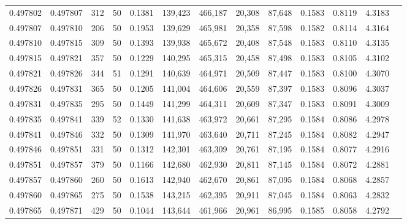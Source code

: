 \begin{tabular}{rrrrrrrrrrrrr}
0.497802 & 0.497807 & 312 &  50 &                                     0.1381 & 139,423 & 466,187 &  20,308 &  87,648 & 0.1583 & 0.8119 & 4.3183 \\
0.497807 & 0.497810 & 206 &  50 &                                     0.1953 & 139,629 & 465,981 &  20,358 &  87,598 & 0.1582 & 0.8114 & 4.3164 \\
0.497810 & 0.497815 & 309 &  50 &                                     0.1393 & 139,938 & 465,672 &  20,408 &  87,548 & 0.1583 & 0.8110 & 4.3135 \\
0.497815 & 0.497821 & 357 &  50 &                                     0.1229 & 140,295 & 465,315 &  20,458 &  87,498 & 0.1583 & 0.8105 & 4.3102 \\
0.497821 & 0.497826 & 344 &  51 &                                     0.1291 & 140,639 & 464,971 &  20,509 &  87,447 & 0.1583 & 0.8100 & 4.3070 \\
0.497826 & 0.497831 & 365 &  50 &                                     0.1205 & 141,004 & 464,606 &  20,559 &  87,397 & 0.1583 & 0.8096 & 4.3037 \\
0.497831 & 0.497835 & 295 &  50 &                                     0.1449 & 141,299 & 464,311 &  20,609 &  87,347 & 0.1583 & 0.8091 & 4.3009 \\
0.497835 & 0.497841 & 339 &  52 &                                     0.1330 & 141,638 & 463,972 &  20,661 &  87,295 & 0.1584 & 0.8086 & 4.2978 \\
0.497841 & 0.497846 & 332 &  50 &                                     0.1309 & 141,970 & 463,640 &  20,711 &  87,245 & 0.1584 & 0.8082 & 4.2947 \\
0.497846 & 0.497851 & 331 &  50 &                                     0.1312 & 142,301 & 463,309 &  20,761 &  87,195 & 0.1584 & 0.8077 & 4.2916 \\
0.497851 & 0.497857 & 379 &  50 &                                     0.1166 & 142,680 & 462,930 &  20,811 &  87,145 & 0.1584 & 0.8072 & 4.2881 \\
0.497857 & 0.497860 & 260 &  50 &                                     0.1613 & 142,940 & 462,670 &  20,861 &  87,095 & 0.1584 & 0.8068 & 4.2857 \\
0.497860 & 0.497865 & 275 &  50 &                                     0.1538 & 143,215 & 462,395 &  20,911 &  87,045 & 0.1584 & 0.8063 & 4.2832 \\
0.497865 & 0.497871 & 429 &  50 &                                     0.1044 & 143,644 & 461,966 &  20,961 &  86,995 & 0.1585 & 0.8058 & 4.2792 \\

\end{tabular}
